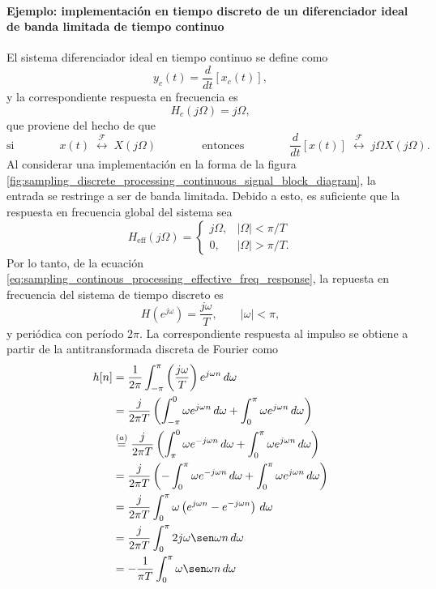 \documentclass[a4paper]{report}
\begin{document}
\paragraph{Ejemplo: implementación en tiempo discreto de un diferenciador ideal de banda limitada de tiempo continuo} El sistema diferenciador ideal en tiempo continuo se define como
\[
 y_c(t)=\frac{d}{dt}[x_c(t)],
\]
y la correspondiente respuesta en frecuencia es
\[
 H_c(j\Omega)=j\Omega,
\]
que proviene del hecho de que 
\[
 \textrm{si}\qquad\qquad
 x(t)\;\overset{\mathcal{F}}{\longleftrightarrow}\;X(j\Omega)
 \qquad\qquad\textrm{entonces}\qquad\qquad
 \frac{d}{dt}[x(t)]\;\overset{\mathcal{F}}{\longleftrightarrow}\;j\Omega X(j\Omega).
\]
Al considerar una implementación en la forma de la figura \ref{fig:sampling_discrete_processing_continuous_signal_block_diagram}, la entrada se restringe a ser de banda limitada. Debido a esto, es suficiente que la respuesta en frecuencia global del sistema sea
\[
 H_\textrm{eff}(j\Omega)
 =\left\{
  \begin{array}{ll}
   j\Omega, & |\Omega|<\pi/T \\
   0, & |\Omega|>\pi/T.
  \end{array}
  \right. 
\]
Por lo tanto, de la ecuación \ref{eq:sampling_continous_processing_effective_freq_response}, la repuesta en frecuencia del sistema de tiempo discreto es
\begin{equation}\label{eq:sampling_differentiator_discrete_freq_response}
 H(e^{j\omega})=\frac{j\omega}{T},
 \qquad
 |\omega|<\pi, 
\end{equation}
y periódica con período \(2\pi\). La correspondiente respuesta al impulso se obtiene a partir de la antitransformada discreta de Fourier como
\begin{align}
 h[n]&=\frac{1}{2\pi}\int_{-\pi}^{\pi}\left(\frac{j\omega}{T}\right)e^{j\omega n}\,d\omega\label{eq:sampling_differentiator_impulse_response_tmp}\\
   &=\frac{j}{2\pi T}\left(\int_{-\pi}^{0}\omega e^{j\omega n}\,d\omega+\int_{0}^{\pi}\omega e^{j\omega n}\,d\omega\right)\nonumber\\
   &\overset{(a)}{=}\frac{j}{2\pi T}\left(\int_{\pi}^{0}\omega e^{-j\omega n}\,d\omega+\int_{0}^{\pi}\omega e^{j\omega n}\,d\omega\right)\nonumber\\
   &=\frac{j}{2\pi T}\left(-\int_0^{\pi}\omega e^{-j\omega n}\,d\omega+\int_{0}^{\pi}\omega e^{j\omega n}\,d\omega\right)\nonumber\\
   &=\frac{j}{2\pi T}\int_0^{\pi}\omega\left(e^{j\omega n}-e^{-j\omega n}\right)\,d\omega\nonumber\\
   &=\frac{j}{2\pi T}\int_0^{\pi}2j\omega\sen\omega n\,d\omega\nonumber\\
   &=-\frac{1}{\pi T}\int_0^{\pi}\omega\sen\omega n\,d\omega\nonumber
\end{align}
\end{document}

